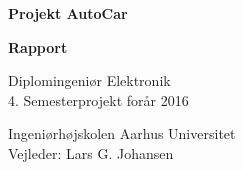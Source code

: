 \documentclass[11pt, a4paper, twoside, openany]{memoir}
\date{}
\author{\forfatter}
\title{\titel}
\begin{document}
\begin{titlingpage}
		
		\begin{center}
				{\huge\bfseries Projekt AutoCar}\\
				\vspace{10pt}
				
				{\Huge\bfseries Rapport}\\
				
				\vspace{20pt}
				
				{Diplomingeniør Elektronik}\\
				{\large 4. Semesterprojekt forår 2016}\\
				
				\vspace{10pt}
				
				Ingeniørhøjskolen Aarhus Universitet\\
				Vejleder: Lars G. Johansen
				\vspace{10pt}
				

\end{center}
\end{titlingpage}
\end{document}
